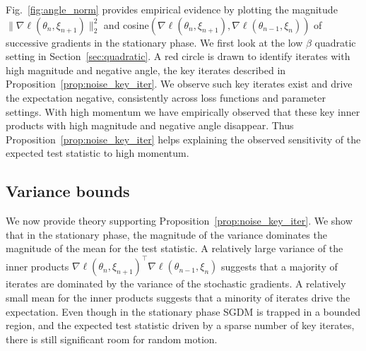 \documentclass[conference]{IEEEtran}
\begin{document}
Fig.~\ref{fig:angle_norm} provides empirical evidence by plotting the magnitude $\| \nabla \ell (\theta_n, \xi_{n+1}) \|_2^2$ and  cosine$(\nabla \ell (\theta_n, \xi_{n+1}), \nabla \ell (\theta_{n-1}, \xi_{n}) )$ of successive gradients in the stationary phase. 
We first look at the low $\beta$ quadratic setting in Section~\ref{sec:quadratic}. 
A red circle is drawn to identify iterates with high magnitude and negative angle, the key iterates described in Proposition~\ref{prop:noise_key_iter}. 
We observe such key iterates exist and drive the expectation negative, consistently across loss functions and parameter settings.  
With high momentum we have empirically observed that these key inner products with high magnitude and negative angle disappear.
Thus Proposition~\ref{prop:noise_key_iter} helps explaining the observed sensitivity of the expected test statistic to high momentum.


\subsection{Variance bounds}
We now provide theory supporting Proposition~\ref{prop:noise_key_iter}. 
We show that in the stationary phase, the magnitude of the variance dominates the magnitude of the mean for the test statistic. 
A relatively large variance of the inner products $\nabla \ell (\theta_n, \xi_{n+1})^\top \nabla \ell (\theta_{n-1}, \xi_n)$ suggests that a majority of iterates are dominated by the variance of the stochastic gradients.
A relatively small mean for the inner products suggests that a minority of iterates drive the expectation. 
Even though in the stationary phase SGDM is trapped in a bounded region, and the expected test statistic driven by a sparse number of key iterates, there is still significant room for random motion.
\end{document}
